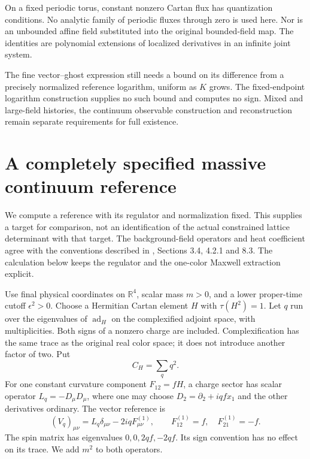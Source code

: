 \documentclass[11pt]{article}
\theoremstyle{remark}
\begin{document}
On a fixed periodic torus, constant nonzero Cartan flux
has quantization conditions. No analytic family of
periodic fluxes through zero is used here. Nor is an
unbounded affine field substituted into the original
bounded-field map. The identities are polynomial
extensions of localized derivatives in an infinite
joint system.

The fine vector--ghost expression still needs a bound
on its difference from a precisely normalized reference
logarithm, uniform as \(K\) grows. The fixed-endpoint
logarithm construction supplies no such bound and
computes no sign. Mixed and large-field histories,
the continuum observable construction and reconstruction
remain separate requirements for full existence.


\section{A completely specified massive continuum reference}
\label{mcr-section}

We compute a reference with its regulator and normalization fixed.
This supplies a target for comparison, not an identification of
the actual constrained lattice determinant with that target.
The background-field operators and heat coefficient agree with
the conventions described in \cite{vassilevichctn}, Sections 3.4,
4.2.1 and 8.3. The calculation below keeps the regulator and
the one-color Maxwell extraction explicit.

Use final physical coordinates on \(\mathbb R^4\), scalar mass
\(m>0\), and a lower proper-time cutoff \(\epsilon^2>0\).
Choose a Hermitian Cartan element \(H\) with
\(\tau(H^2)=1\). Let \(q\) run over the eigenvalues of
\(\operatorname{ad}_H\) on the complexified adjoint space,
with multiplicities. Both signs of a nonzero charge are
included. Complexification has the same trace as the
original real color space; it does not introduce another
factor of two. Put
\[
 C_H=\sum_q q^2.
\]
For one constant curvature component \(F_{12}=fH\), a charge
sector has scalar operator \(L_q=-D_\mu D_\mu\), where one
may choose \(D_2=\partial_2+iqf x_1\) and the other derivatives
ordinary. The vector reference is
\[
 (V_q)_{\mu\nu}=L_q\delta_{\mu\nu}-2iqF^{(1)}_{\mu\nu},
 \qquad F^{(1)}_{12}=f,\quad F^{(1)}_{21}=-f.
\]
The spin matrix has eigenvalues \(0,0,2qf,-2qf\).
Its sign convention has no effect on its trace.
We add \(m^2\) to both operators.
\end{document}
